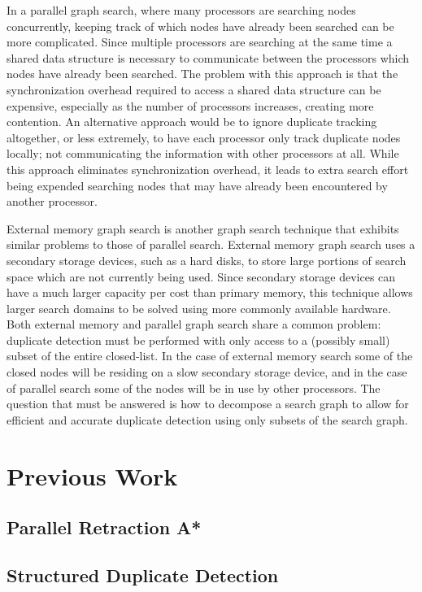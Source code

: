 \documentclass{article} \usepackage{aaai} \usepackage{graphicx}
\begin{document}
In a parallel graph search, where many processors are searching nodes
concurrently, keeping track of which nodes have already been searched
can be more complicated.  Since multiple processors are searching at
the same time a shared data structure is necessary to communicate
between the processors which nodes have already been searched.  The
problem with this approach is that the synchronization overhead
required to access a shared data structure can be expensive,
especially as the number of processors increases, creating more
contention.  An alternative approach would be to ignore duplicate
tracking altogether, or less extremely, to have each processor only
track duplicate nodes locally; not communicating the information with
other processors at all.  While this approach eliminates
synchronization overhead, it leads to extra search effort being
expended searching nodes that may have already been encountered by
another processor.

External memory graph search is another graph search technique that
exhibits similar problems to those of parallel search.  External
memory graph search uses a secondary storage devices, such as a hard
disks, to store large portions of search space which are not currently
being used.  Since secondary storage devices can have a much larger
capacity per cost than primary memory, this technique allows larger
search domains to be solved using more commonly available hardware.
Both external memory and parallel graph search share a common problem:
duplicate detection must be performed with only access to a (possibly
small) subset of the entire closed-list.  In the case of external
memory search some of the closed nodes will be residing on a slow
secondary storage device, and in the case of parallel search some of
the nodes will be in use by other processors.  The question that must
be answered is how to decompose a search graph to allow for efficient
and accurate duplicate detection using only subsets of the search
graph.

\section{Previous Work}

\subsection{Parallel Retraction A*}

\subsection{Structured Duplicate Detection}
\end{document}
